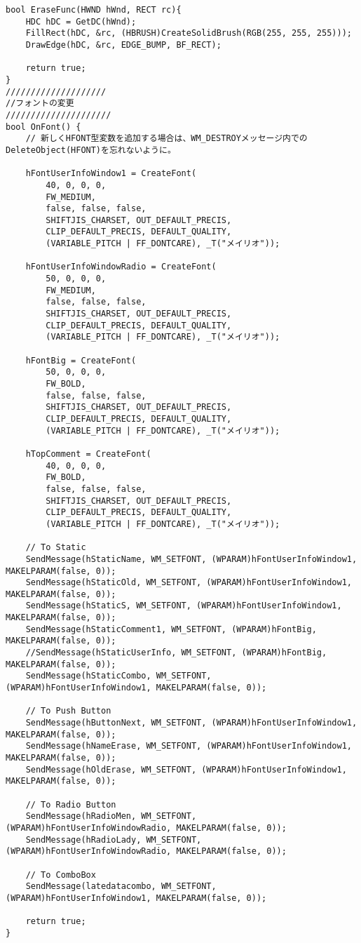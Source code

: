 \begin{lstlisting}[caption=UserInfoWindow.cpp]
bool EraseFunc(HWND hWnd, RECT rc){
	HDC hDC = GetDC(hWnd);
	FillRect(hDC, &rc, (HBRUSH)CreateSolidBrush(RGB(255, 255, 255)));
	DrawEdge(hDC, &rc, EDGE_BUMP, BF_RECT);

	return true;
}
////////////////////
//フォントの変更
/////////////////////
bool OnFont() {
	// 新しくHFONT型変数を追加する場合は、WM_DESTROYメッセージ内でのDeleteObject(HFONT)を忘れないように。

	hFontUserInfoWindow1 = CreateFont(
		40, 0, 0, 0,
		FW_MEDIUM,
		false, false, false,
		SHIFTJIS_CHARSET, OUT_DEFAULT_PRECIS,
		CLIP_DEFAULT_PRECIS, DEFAULT_QUALITY,
		(VARIABLE_PITCH | FF_DONTCARE), _T("メイリオ"));

	hFontUserInfoWindowRadio = CreateFont(
		50, 0, 0, 0,
		FW_MEDIUM,
		false, false, false,
		SHIFTJIS_CHARSET, OUT_DEFAULT_PRECIS,
		CLIP_DEFAULT_PRECIS, DEFAULT_QUALITY,
		(VARIABLE_PITCH | FF_DONTCARE), _T("メイリオ"));

	hFontBig = CreateFont(
		50, 0, 0, 0,
		FW_BOLD,
		false, false, false,
		SHIFTJIS_CHARSET, OUT_DEFAULT_PRECIS,
		CLIP_DEFAULT_PRECIS, DEFAULT_QUALITY,
		(VARIABLE_PITCH | FF_DONTCARE), _T("メイリオ"));

	hTopComment = CreateFont(
		40, 0, 0, 0,
		FW_BOLD,
		false, false, false,
		SHIFTJIS_CHARSET, OUT_DEFAULT_PRECIS,
		CLIP_DEFAULT_PRECIS, DEFAULT_QUALITY,
		(VARIABLE_PITCH | FF_DONTCARE), _T("メイリオ"));

	// To Static
	SendMessage(hStaticName, WM_SETFONT, (WPARAM)hFontUserInfoWindow1, MAKELPARAM(false, 0));
	SendMessage(hStaticOld, WM_SETFONT, (WPARAM)hFontUserInfoWindow1, MAKELPARAM(false, 0));
	SendMessage(hStaticS, WM_SETFONT, (WPARAM)hFontUserInfoWindow1, MAKELPARAM(false, 0));
	SendMessage(hStaticComment1, WM_SETFONT, (WPARAM)hFontBig, MAKELPARAM(false, 0));
	//SendMessage(hStaticUserInfo, WM_SETFONT, (WPARAM)hFontBig, MAKELPARAM(false, 0));
	SendMessage(hStaticCombo, WM_SETFONT, (WPARAM)hFontUserInfoWindow1, MAKELPARAM(false, 0));

	// To Push Button
	SendMessage(hButtonNext, WM_SETFONT, (WPARAM)hFontUserInfoWindow1, MAKELPARAM(false, 0));
	SendMessage(hNameErase, WM_SETFONT, (WPARAM)hFontUserInfoWindow1, MAKELPARAM(false, 0));
	SendMessage(hOldErase, WM_SETFONT, (WPARAM)hFontUserInfoWindow1, MAKELPARAM(false, 0));

	// To Radio Button
	SendMessage(hRadioMen, WM_SETFONT, (WPARAM)hFontUserInfoWindowRadio, MAKELPARAM(false, 0));
	SendMessage(hRadioLady, WM_SETFONT, (WPARAM)hFontUserInfoWindowRadio, MAKELPARAM(false, 0));

	// To ComboBox
	SendMessage(latedatacombo, WM_SETFONT, (WPARAM)hFontUserInfoWindow1, MAKELPARAM(false, 0));

	return true;
}
\end{lstlisting}

